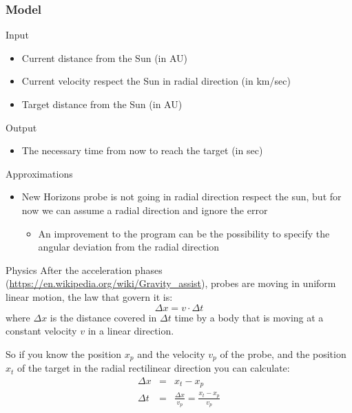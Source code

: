 \begin{frame}
  \frametitle{Model}
  \begin{block}{Input}
    \begin{itemize}
    \item Current \alert{distance} from the Sun (in AU)
    \item Current \alert{velocity} respect the Sun in radial direction (in km/sec)
    \item \alert{Target} distance from the Sun (in AU)
    \end{itemize}
  \end{block}
  \begin{block}{Output}
    \begin{itemize}
    \item The necessary \alert{time} from now to reach the target (in sec)
    \end{itemize}
  \end{block}
  \begin{block}{Approximations}
    \begin{itemize}
    \item New Horizons probe is not going in radial direction respect
      the sun, but for
      now we can assume a radial direction and ignore the error
      \begin{itemize}
      \item An improvement to the program can be the possibility to
        specify the angular deviation from the radial direction
      \end{itemize}
    \end{itemize}
  \end{block}
\end{frame}

\begin{frame}
  \begin{block}{Physics}
    After the acceleration phases (\url{https://en.wikipedia.org/wiki/Gravity_assist}), probes are moving in \alert{uniform linear
    motion}, the law that govern it is:
    \begin{equation*}
      \Delta x = v \cdot \Delta t
    \end{equation*}
    where \alert{$\Delta x$} is the distance covered in \alert{$\Delta t$} time by a
    body that is moving at a constant velocity \alert{$v$} in a
    linear direction.
  \end{block}
  So if you know the position $x_p$ and the velocity $v_p$ of the
  probe, and the position $x_t$ of the target in the radial
  rectilinear direction you can calculate:
  \begin{eqnarray*}
    \Delta x&=&x_t - x_p\\
    \Delta t&=&\frac{\Delta x}{v_p}=\frac{x_t - x_p}{v_p}
  \end{eqnarray*}
\end{frame}

